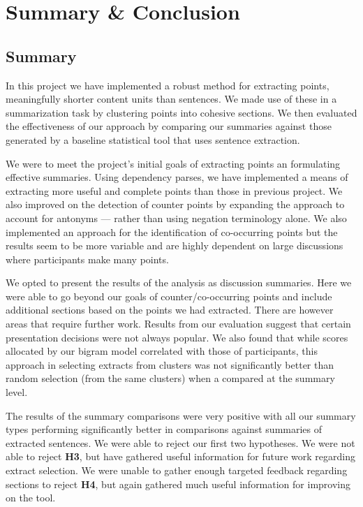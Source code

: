 \chapter{Summary \& Conclusion \label{chap:conclusion}}
  \section{Summary}
    In this project we have implemented a robust method for extracting points, meaningfully shorter content units than sentences. We made use of these in a summarization task by clustering points into cohesive sections. We then evaluated the effectiveness of our approach by comparing our summaries against those generated by a baseline statistical tool that uses sentence extraction.

    We were to meet the project's initial goals of extracting points an formulating effective summaries. Using dependency parses, we have implemented a means of extracting more useful and complete points than those in previous project. We also improved on the detection of counter points by expanding the approach to account for antonyms --- rather than using negation terminology alone. We also implemented an approach for the identification of co-occurring points but the results seem to be more variable and are highly dependent on large discussions where participants make many points.

    We opted to present the results of the analysis as discussion summaries. Here we were able to go beyond our goals of counter/co-occurring points and include additional sections based on the points we had extracted. There are however areas that require further work. Results from our evaluation suggest that certain presentation decisions were not always popular. We also found that while scores allocated by our bigram model correlated with those of participants, this approach in selecting extracts from clusters was not significantly better than random selection (from the same clusters) when a compared at the summary level.

    The results of the summary comparisons were very positive with all our summary types performing significantly better in comparisons against summaries of extracted sentences. We were able to reject our first two hypotheses. We were not able to reject \textbf{H3}, but have gathered useful information for future work regarding extract selection. We were unable to gather enough targeted feedback regarding sections to reject \textbf{H4}, but again gathered much useful information for improving on the tool.

